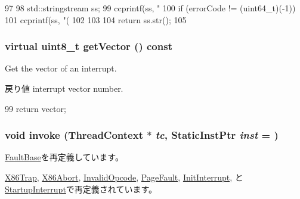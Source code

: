 \begin{DoxyCode}
97     {
98         std::stringstream ss;
99         ccprintf(ss, "%
100         if (errorCode != (uint64_t)(-1)) {
101             ccprintf(ss, "(%
102         }
103 
104         return ss.str();
105     }
\end{DoxyCode}
\hypertarget{classX86ISA_1_1X86FaultBase_a43ecb580ea3927f499dc82682f1b9a6a}{
\subsubsection[{getVector}]{\setlength{\rightskip}{0pt plus 5cm}virtual uint8\_\-t getVector () const}}
\label{classX86ISA_1_1X86FaultBase_a43ecb580ea3927f499dc82682f1b9a6a}
Get the vector of an interrupt.

\begin{DoxyReturn}{戻り値}
interrupt vector number. 
\end{DoxyReturn}



\begin{DoxyCode}
99 { return vector; }
\end{DoxyCode}
\hypertarget{classX86ISA_1_1X86FaultBase_a2bd783b42262278d41157d428e1f8d6f}{
\subsubsection[{invoke}]{\setlength{\rightskip}{0pt plus 5cm}void invoke ({\bf ThreadContext} $\ast$ {\em tc}, \/  {\bf StaticInstPtr} {\em inst} = {})}}
\label{classX86ISA_1_1X86FaultBase_a2bd783b42262278d41157d428e1f8d6f}


\hyperlink{classFaultBase_a2bd783b42262278d41157d428e1f8d6f}{FaultBase}を再定義しています。

\hyperlink{classX86ISA_1_1X86Trap_a2bd783b42262278d41157d428e1f8d6f}{X86Trap}, \hyperlink{classX86ISA_1_1X86Abort_a2bd783b42262278d41157d428e1f8d6f}{X86Abort}, \hyperlink{classX86ISA_1_1InvalidOpcode_a2bd783b42262278d41157d428e1f8d6f}{InvalidOpcode}, \hyperlink{classX86ISA_1_1PageFault_a2bd783b42262278d41157d428e1f8d6f}{PageFault}, \hyperlink{classX86ISA_1_1InitInterrupt_a2bd783b42262278d41157d428e1f8d6f}{InitInterrupt}, と \hyperlink{classX86ISA_1_1StartupInterrupt_a2bd783b42262278d41157d428e1f8d6f}{StartupInterrupt}で再定義されています。


